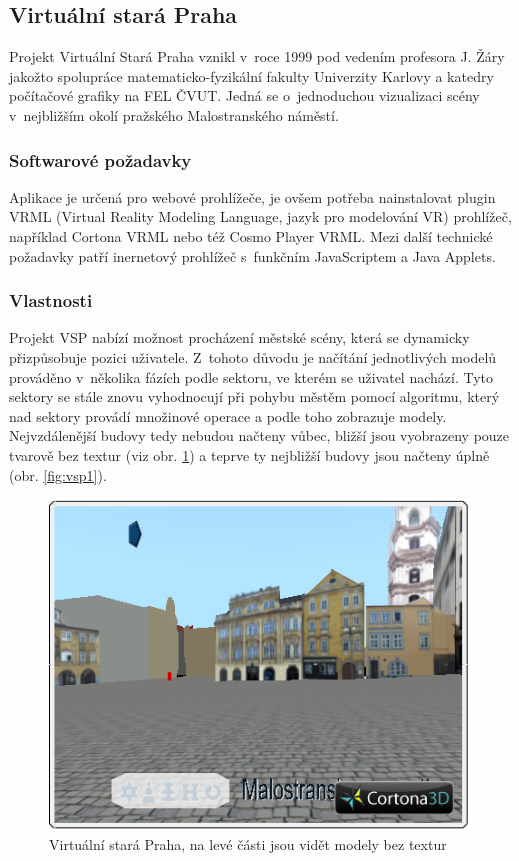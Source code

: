 \documentclass[thesis=B,czech]{FITthesis}[2012/06/26]
\begin{document}
    \subsection{Virtuální stará Praha}
    
    Projekt Virtuální Stará Praha vznikl v~roce 1999 pod vedením profesora J. Žáry jakožto spolupráce matematicko-fyzikální fakulty Univerzity Karlovy a katedry počítačové grafiky na FEL ČVUT. Jedná se o~jednoduchou vizualizaci scény v~nejbližším okolí pražského Malostranského náměstí. \cite{VSP}
    
        \subsubsection{Softwarové požadavky}
        
        Aplikace je určená pro webové prohlížeče, je ovšem potřeba nainstalovat plugin VRML (Virtual Reality Modeling Language, jazyk pro modelování VR) prohlížeč, například Cortona VRML nebo též Cosmo Player VRML. Mezi další technické požadavky patří inernetový prohlížeč s~funkčním JavaScriptem a Java Applets. \cite{VSP}
        
        \subsubsection{Vlastnosti}
        
        Projekt VSP nabízí možnost procházení městské scény, která se dynamicky přizpůsobuje pozici uživatele. Z~tohoto důvodu je načítání jednotlivých modelů prováděno v~několika fázích podle sektoru, ve kterém se uživatel nachází. Tyto sektory se stále znovu vyhodnocují při pohybu městěm pomocí algoritmu, který nad sektory provádí množinové operace a podle toho zobrazuje modely. Nejvzdálenější budovy tedy nebudou načteny vůbec, bližší jsou vyobrazeny pouze tvarově bez textur (viz obr. \ref{fig:vsp2})  a teprve ty nejbližší budovy jsou načteny úplně (obr. \ref{fig:vsp1}).  \cite{VSP}
        
                
        
	
	\begin{figure}
  		\includegraphics{vsp2.png}
  		\caption{Virtuální stará Praha, na levé části jsou vidět modely bez textur}
  		\label{fig:vsp2}
	\end{figure}
	
\end{document}
